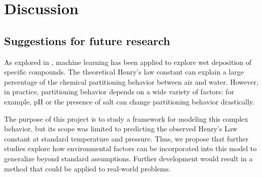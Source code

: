 \documentclass[12pt, oneside]{article}   	%
\begin{document}
\section{Discussion}

\subsection{Suggestions for future research}
As explored in \cite{Stojic:2019}, machine learning has been applied to explore wet deposition of specific compounds. The theoretical Henry's law constant can explain a large percentage of the chemical partitioning behavior between air and water. However, in practice, partitioning behavior depends on a wide variety of factors: for example, pH or the presence of salt can change partitioning behavior drastically.

The purpose of this project is to study a framework for modeling this complex behavior, but its scope was limited to predicting the observed Henry's Law constant at standard temperature and pressure. Thus, we propose that further studies explore how environmental factors can be incorporated into this model to generalize beyond standard assumptions. Further development would result in a method that could be applied to real-world problems.


{}

\end{document}
